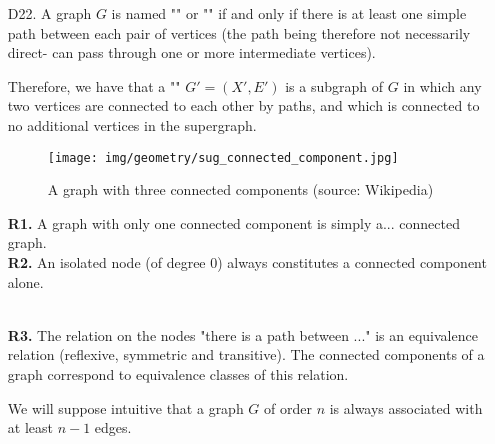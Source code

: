 {\begin{enumerate}
\begin{dem}
	 which contradicts our initial choice as a shortest path.
	 \begin{flushright}
		$\square$  Q.E.D.
	\end{flushright}
	 \end{dem}
	 
	 \item[D22.] A graph $G$ is named "" or "" if and only if there is at least one simple path between each pair of vertices (the path being therefore not necessarily direct- can pass through one or more intermediate vertices).
	 
	 Therefore, we have that a "" $G'=(X',E')$ is a subgraph of $G$ in which any two vertices are connected to each other by paths, and which is connected to no additional vertices in the supergraph.
	 \begin{figure}[H]
		\centering
		\texttt{[image: img/geometry/sug\_connected\_component.jpg]}
		\caption[A graph with three connected components]{A graph with three connected components (source: Wikipedia)}
	\end{figure}
	\begin{tcolorbox}[title=Remarks,colframe=black,arc=10pt]
	\textbf{R1.} A graph with only one connected component is simply a... connected graph. \\
	
	\textbf{R2.} An isolated node (of degree $0$) always constitutes a connected component alone.\\\
	
	\textbf{R3.} The relation on the nodes "there is a path between ..." is an equivalence relation (reflexive, symmetric and transitive). The connected components of a graph correspond to equivalence classes of this relation.
	\end{tcolorbox}
	We will suppose intuitive that a graph $G$ of order $n$ is always associated with at least $n-1$ edges.
	

\end{enumerate}}
